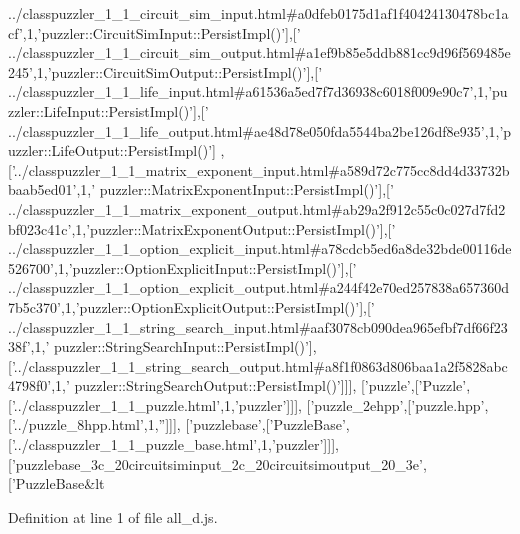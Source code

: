 \begin{DoxyCode}
{      ../classpuzzler\_1\_1\_circuit\_sim\_input.html#a0dfeb0175d1af1f40424130478bc1acf'},1,\textcolor{stringliteral}{'puzzler::CircuitSimInput::PersistImpl()'}],[\textcolor{stringliteral}{'
      ../classpuzzler\_1\_1\_circuit\_sim\_output.html#a1ef9b85e5ddb881cc9d96f569485e245'},1,\textcolor{stringliteral}{'puzzler::CircuitSimOutput::PersistImpl()'}],[\textcolor{stringliteral}{'
      ../classpuzzler\_1\_1\_life\_input.html#a61536a5ed7f7d36938c6018f009e90c7'},1,\textcolor{stringliteral}{'puzzler::LifeInput::PersistImpl()'}],[\textcolor{stringliteral}{'
      ../classpuzzler\_1\_1\_life\_output.html#ae48d78e050fda5544ba2be126df8e935'},1,\textcolor{stringliteral}{'puzzler::LifeOutput::PersistImpl()'}]
      ,[\textcolor{stringliteral}{'../classpuzzler\_1\_1\_matrix\_exponent\_input.html#a589d72c775cc8dd4d33732bbaab5ed01'},1,\textcolor{stringliteral}{'
      puzzler::MatrixExponentInput::PersistImpl()'}],[\textcolor{stringliteral}{'
      ../classpuzzler\_1\_1\_matrix\_exponent\_output.html#ab29a2f912c55c0c027d7fd2bf023c41c'},1,\textcolor{stringliteral}{'puzzler::MatrixExponentOutput::PersistImpl()'}],[\textcolor{stringliteral}{'
      ../classpuzzler\_1\_1\_option\_explicit\_input.html#a78cdcb5ed6a8de32bde00116de526700'},1,\textcolor{stringliteral}{'puzzler::OptionExplicitInput::PersistImpl()'}],[\textcolor{stringliteral}{'
      ../classpuzzler\_1\_1\_option\_explicit\_output.html#a244f42e70ed257838a657360d7b5c370'},1,\textcolor{stringliteral}{'puzzler::OptionExplicitOutput::PersistImpl()'}],[\textcolor{stringliteral}{'
      ../classpuzzler\_1\_1\_string\_search\_input.html#aaf3078cb090dea965efbf7df66f2338f'},1,\textcolor{stringliteral}{'
      puzzler::StringSearchInput::PersistImpl()'}],[\textcolor{stringliteral}{'../classpuzzler\_1\_1\_string\_search\_output.html#a8f1f0863d806baa1a2f5828abc4798f0'},1,\textcolor{stringliteral}{'
      puzzler::StringSearchOutput::PersistImpl()'}]]],
  [\textcolor{stringliteral}{'puzzle'},[\textcolor{stringliteral}{'Puzzle'},[\textcolor{stringliteral}{'../classpuzzler\_1\_1\_puzzle.html'},1,\textcolor{stringliteral}{'puzzler'}]]],
  [\textcolor{stringliteral}{'puzzle\_2ehpp'},[\textcolor{stringliteral}{'puzzle.hpp'},[\textcolor{stringliteral}{'../puzzle\_8hpp.html'},1,\textcolor{stringliteral}{''}]]],
  [\textcolor{stringliteral}{'puzzlebase'},[\textcolor{stringliteral}{'PuzzleBase'},[\textcolor{stringliteral}{'../classpuzzler\_1\_1\_puzzle\_base.html'},1,\textcolor{stringliteral}{'puzzler'}]]],
  [\textcolor{stringliteral}{'puzzlebase\_3c\_20circuitsiminput\_2c\_20circuitsimoutput\_20\_3e'},[\textcolor{stringliteral}{'PuzzleBase&lt}
\end{DoxyCode}


Definition at line 1 of file all\+\_\+d.\+js.


